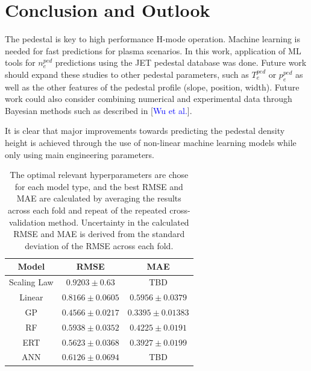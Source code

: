 \documentclass[a4paper, twoside, final, 12pt]{article}
\begin{document}
{\section{Conclusion and Outlook}
The pedestal is key to high performance H-mode operation. Machine learning is needed for fast predictions for plasma scenarios. In this work, application of ML tools for $n_e^{ped}$ predictions using the JET pedestal database was done. Future work should expand these studies to other pedestal parameters, such as $T_e^{ped} \text{ or } p_e^{ped}$ as well as the other features of the pedestal profile (slope, position, width). Future work could also consider combining numerical and experimental data through Bayesian methods such as described in [\textcolor{blue}{Wu et al.}]. 

It is clear that major improvements towards predicting the pedestal density height is achieved through the use of non-linear machine learning models while only using main engineering parameters.

\begin{table}[h]
	\begin{center}
		\begin{tabular}{| c | c | c |}
		\hline
		Model & RMSE & MAE \\
		\hline
		Scaling Law & $0.9203 \pm 0.63$ & TBD \\
		\hline
		Linear & $0.8166 \pm 0.0605 $ & $0.5956 \pm 0.0379$ \\
		GP & $0.4566 \pm  0.0217$ &  $0.3395 \pm 0.01383$\\
		RF & $0.5938 \pm 0.0352$ & $0.4225 \pm 0.0191$ \\
		ERT &$0.5623 \pm 0.0368 $ & $0.3927 \pm 0.0199$ \\
		ANN & $0.6126 \pm 0.0694$ & TBD \\
		\hline
		\end{tabular}
		\caption{The optimal relevant hyperparameters are chose for each model type, and the best RMSE and MAE are calculated by averaging the results across each fold and repeat of the repeated cross-validation method. Uncertainty in the calculated RMSE and MAE is derived from the  standard deviation of the RMSE across each fold.}
		\label{tab:performance_models}
	\end{center}
\end{table}

}
\end{document}
